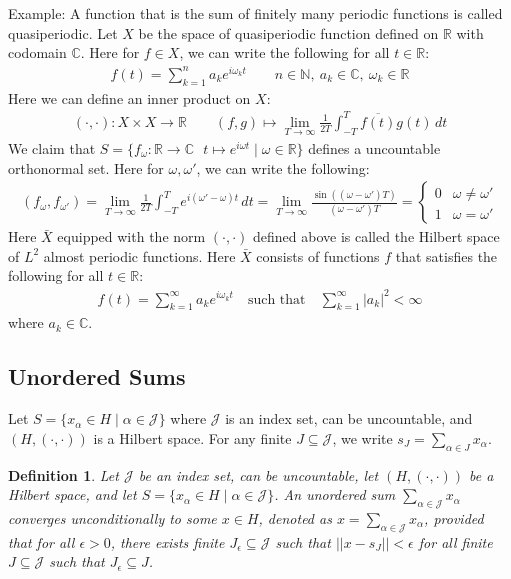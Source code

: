 \documentclass[11pt]{book}
\theoremstyle{break}
\theoremstyle{break}
\newtheorem{defn}{Definition}[corL]
\newcommand{\R}{\mathbb{R}}
\newcommand{\N}{\mathbb{N}}
\newcommand{\C}{\mathbb{C}}
\newcommand{\example}{\color{green}Example: \color{black}}
\begin{document}
\example
A function that is the sum of finitely many periodic functions is called quasiperiodic. Let $X$ be the space of quasiperiodic function defined on $\R$ with codomain $\C$. Here for $f \in X$, we can write the following for all $t \in \R$:
\begin{align*}
f(t) = \sum_{k=1}^n a_k e^{i\omega_k t} \qquad n \in \N,\ a_k \in \C,\ \omega_k \in \R
\end{align*}
Here we can define an inner product on $X$:
\begin{align*}
(\cdot, \cdot ): X\times X \to \R \qquad (f,g) \mapsto \lim_{T \to \infty}\frac{1}{2T}\int_{-T}^T \overline{f(t)}g(t) \, dt
\end{align*}
We claim that $S = \{f_\omega:\R \to \C \ \ \ t\mapsto e^{i\omega t} \mid \omega \in \R \}$ defines a uncountable orthonormal set. Here for $\omega,\omega'$, we can write the following:
\begin{align*}
(f_\omega, f_{\omega'} )=\lim_{T \to \infty}\frac{1}{2T}\int_{-T}^T e^{i(\omega' - \omega) t}\, dt = \lim_{T\to \infty}\frac{\sin((\omega - \omega') T)}{(\omega - \omega') T} = \begin{cases}
0 & \omega \neq \omega'\\
1 & \omega = \omega'
\end{cases} 
\end{align*}
Here $\bar{X}$ equipped with the norm $(\cdot, \cdot)$ defined above is called the Hilbert space of $L^2$ almost periodic functions. Here $\bar{X}$ consists of functions $f$ that satisfies the following for all $t \in \R$:
\begin{align*}
f(t) = \sum_{k=1}^\infty a_k e^{i\omega_k t} \quad \text{such that}\quad	\sum_{k=1}^\infty |a_k|^2 < \infty
\end{align*}
where $a_k \in \C$. \\

\hfill\break
\subsection{Unordered Sums}
Let $S = \{ x_{\alpha} \in H \mid \alpha \in \mathcal{J}\}$ where $\mathcal{J}$ is an index set, can be uncountable, and $(H,(\cdot, \cdot))$ is a Hilbert space. For any finite $J \subseteq \mathcal{J}$, we write $s_J = \sum_{\alpha \in J} x_{\alpha}$. 

\begin{defn}
Let $\mathcal{J}$ be an index set, can be uncountable, let $(H,(\cdot, \cdot))$ be a Hilbert space, and let $S = \{ x_{\alpha} \in H \mid \alpha \in \mathcal{J}\}$. An unordered sum $\sum_{\alpha \in \mathcal{J}}x_\alpha$ converges unconditionally to some $x \in H$, denoted as $x = \sum_{\alpha \in \mathcal{J}}x_{\alpha}$, provided that for all $\epsilon>0$, there exists finite $J_{\epsilon}\subseteq \mathcal{J}$ such that $||x - s_{J}||<\epsilon$ for all finite $J \subseteq \mathcal{J}$ such that $J_{\epsilon} \subseteq J$.
\end{defn}
\end{document}
